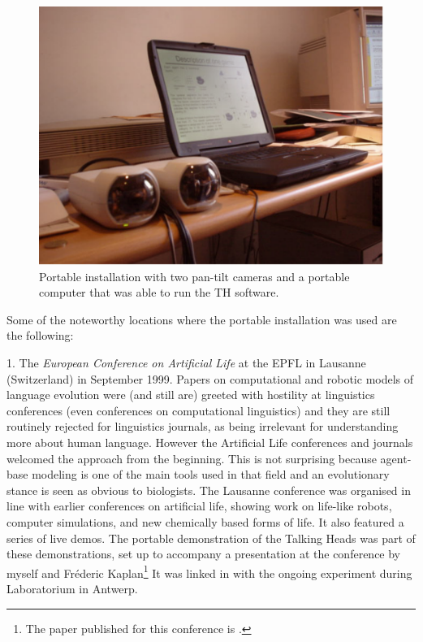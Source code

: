 \begin{figure}[htbp]
  \centerline{\includegraphics[width=.60\textwidth]{chap9/figs/road.pdf}}
\caption{\label{fig:road}Portable installation with two pan-tilt cameras and a portable computer that was able to run the TH software.}
\end{figure}

Some of the noteworthy locations where the portable installation was used are the following: 

1. The {\itshape European Conference on Artificial Life} at the EPFL in Lausanne (Switzerland) in September 1999. 
Papers on computational and robotic 
models of language evolution were (and still are) greeted with hostility at linguistics conferences (even 
conferences on computational linguistics) and they are still routinely rejected for linguistics journals, as 
being irrelevant for understanding more about human language. 
However the Artificial Life conferences and journals welcomed the approach from the beginning. This is 
not surprising because agent-base modeling is one of the main tools used in that field and an evolutionary 
stance is seen as obvious to biologists. The Lausanne conference was organised in line with earlier 
conferences on artificial life, showing work on life-like robots, computer simulations, and new chemically based 
forms of life. It also featured a series of live demos. The portable demonstration of the Talking Heads was part 
of these demonstrations, set up to accompany a presentation at 
the conference by myself and Fr\'{e}deric Kaplan\footnote{
The paper published for this conference is \cite{Steels:1999}.}
It was linked in with the ongoing experiment during Laboratorium in Antwerp. 

